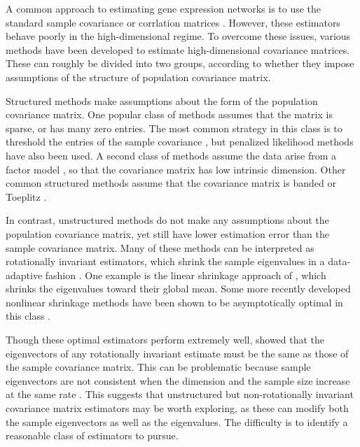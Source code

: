 \documentclass[useAMS,referee,usenatbib]{biom}
\begin{document}
A common approach to estimating gene expression networks is to use the standard sample covariance or corrlation matrices \citep{langfelder2008wgcna, zhang2005general}. However, these estimators behave poorly in the high-dimensional regime. To overcome these issues, various methods have been developed to estimate high-dimensional covariance matrices. These can roughly be divided into two groups, according to whether they impose assumptions of the structure of population covariance matrix.

Structured methods make assumptions about the form of the population covariance matrix. One popular class of methods assumes that the matrix is sparse, or has many zero entries. The most common strategy in this class is to threshold the entries of the sample covariance \citep{rothman2009generalized, cai2011adaptive}, but penalized likelihood methods \citep{xue2012positive} have also been used. A second class of methods assume the data arise from a factor model \citep{fan2008high}, so that the covariance matrix has low intrinsic dimension. Other common structured methods assume that the covariance matrix is banded \citep{li2017estimation} or Toeplitz \citep{liu2017covariance}.

In contrast, unstructured methods do not make any assumptions about the population covariance matrix, yet still have lower estimation error than the sample covariance matrix. Many of these methods can be interpreted as rotationally invariant estimators, which shrink the sample eigenvalues in a data-adaptive fashion \citep{bun2016rotational, stein1975estimation, stein1986lectures}. One example is the linear shrinkage approach of \citet{ledoit2004well}, which shrinks the eigenvalues toward their global mean. Some more recently developed nonlinear shrinkage methods have been shown to be asymptotically optimal in this class \citep{ledoit2012nonlinear, ledoit2019quadratic, lam2016nonparametric}.

Though these optimal estimators perform extremely well, \citet{bun2016rotational} showed that the eigenvectors of any rotationally invariant estimate must be the same as those of the sample covariance matrix. This can be problematic because sample eigenvectors are not consistent when the dimension and the sample size increase at the same rate \citep{mestre2008asymptotic}. This suggests that unstructured but non-rotationally invariant covariance matrix estimators may be worth exploring, as these can modify both the sample eigenvectors as well as the eigenvalues. The difficulty is to identify a reasonable class of estimators to pursue.
\end{document}
